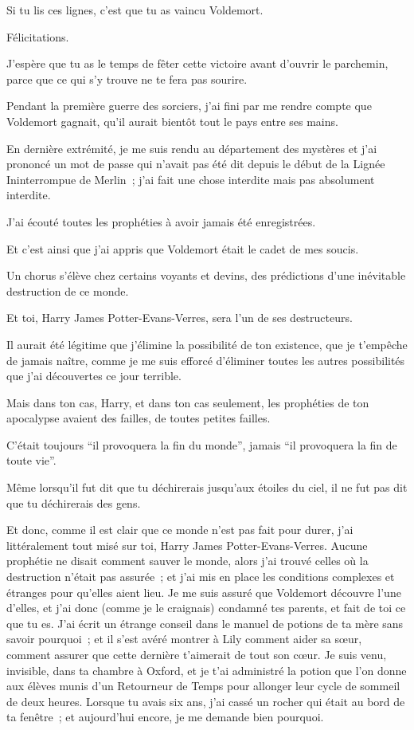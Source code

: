 \later
\begin{writtenNote}

Si tu lis ces lignes, c'est que tu as vaincu Voldemort.

Félicitations.

J'espère que tu as le temps de fêter cette victoire avant d'ouvrir le parchemin, parce que ce qui s'y trouve ne te fera pas sourire.

Pendant la première guerre des sorciers, j'ai fini par me rendre compte que Voldemort gagnait, qu'il aurait bientôt tout le pays entre ses mains.

En dernière extrémité, je me suis rendu au département des mystères et j'ai prononcé un mot de passe qui n'avait pas été dit depuis le début de la Lignée Ininterrompue de Merlin~; j'ai fait une chose interdite mais pas absolument interdite.

J'ai écouté toutes les prophéties à avoir jamais été enregistrées.

Et c'est ainsi que j'ai appris que Voldemort était le cadet de mes soucis.

Un chorus s'élève chez certains voyants et devins, des prédictions d'une inévitable destruction de ce monde.

Et toi, Harry James Potter-Evans-Verres, sera l'un de ses destructeurs.

Il aurait été légitime que j'élimine la possibilité de ton existence, que je t'empêche de jamais naître, comme je me suis efforcé d'éliminer toutes les autres possibilités que j'ai découvertes ce jour terrible.

Mais dans ton cas, Harry, et dans ton cas seulement, les prophéties de ton apocalypse avaient des failles, de toutes petites failles.

C'était toujours “il provoquera la fin du monde”, jamais “il provoquera la fin de toute vie”.

Même lorsqu'il fut dit que tu déchirerais jusqu'aux étoiles du ciel, il ne fut pas dit que tu déchirerais des gens.

Et donc, comme il est clair que ce monde n'est pas fait pour durer, j'ai littéralement tout misé sur toi, Harry James Potter-Evans-Verres. Aucune prophétie ne disait comment sauver le monde, alors j'ai trouvé celles où la destruction n'était pas assurée~; et j'ai mis en place les conditions complexes et étranges pour qu'elles aient lieu. Je me suis assuré que Voldemort découvre l'une d'elles, et j'ai donc (comme je le craignais) condamné tes parents, et fait de toi ce que tu es. J'ai écrit un étrange conseil dans le manuel de potions de ta mère sans savoir pourquoi~; et il s'est avéré montrer à Lily comment aider sa sœur, comment assurer que cette dernière t'aimerait de tout son cœur. Je suis venu, invisible, dans ta chambre à Oxford, et je t'ai administré la potion que l'on donne aux élèves munis d'un Retourneur de Temps pour allonger leur cycle de sommeil de deux heures. Lorsque tu avais six ans, j'ai cassé un rocher qui était au bord de ta fenêtre~; et aujourd'hui encore, je me demande bien pourquoi.


\end{writtenNote}
